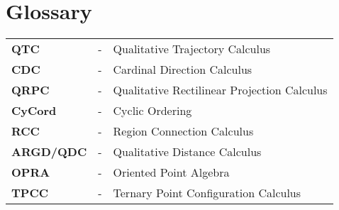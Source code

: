 \documentclass[rnd]{mas_report}
\newcommand\nomenclature[3]{#1 & #2 & #3 \\}
\begin{document}
\newpage
\chapter*{Glossary}
\begin{longtable}{@{}p{3cm}@{}p{1cm}@{}p{\dimexpr\textwidth-1cm\relax}@{}}
	\label{QTC}\nomenclature{\textbf{QTC}}{-}{Qualitative Trajectory Calculus }%
	\label{CDC}\nomenclature{\textbf{CDC}}{-}{Cardinal Direction Calculus}%
	\label{QRPC}\nomenclature{\textbf{QRPC}}{-}{Qualitative Rectilinear Projection Calculus}%
	\label{CyCord}\nomenclature{\textbf{CyCord}}{-}{Cyclic Ordering}%
	\label{RCC}\nomenclature{\textbf{RCC}}{-}{Region Connection Calculus}%
	\label{ARGD}\nomenclature{\textbf{ARGD/QDC}}{-}{Qualitative Distance Calculus}%
	\label{OPRA}\nomenclature{\textbf{OPRA}}{-}{Oriented Point Algebra}%
	\label{TPCC}\nomenclature{\textbf{TPCC}}{-}{Ternary Point Configuration Calculus}%
\end{longtable}

\tableofcontents
\listoffigures
\listoftables


\mainmatter %

\pagestyle{mainmatter}










%
%

\backmatter

\end{document}
